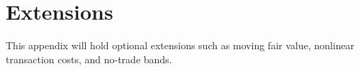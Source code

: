 \section{Extensions}

This appendix will hold optional extensions such as moving fair value, nonlinear transaction costs, and no-trade bands.
